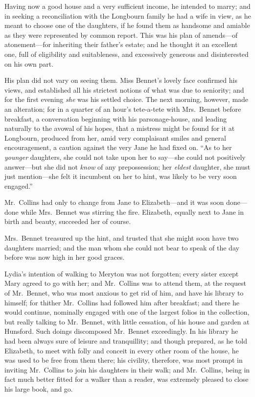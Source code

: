 \documentclass[12pt,english,oneside]{book}
\begin{document}
Having now a good house and a very sufficient income, he intended
to marry; and in seeking a reconciliation with the Longbourn family
he had a wife in view, as he meant to choose one of the daughters,
if he found them as handsome and amiable as they were represented
by common report. This was his plan of amends\mbox{---}of atonement\mbox{---}for
inheriting their father's estate; and he thought it an excellent one,
full of eligibility and suitableness, and excessively generous and
disinterested on his own part.

His plan did not vary on seeing them. Miss Bennet's lovely face confirmed
his views, and established all his strictest notions of what was due
to seniority; and for the first evening \textit{she} was his settled
choice. The next morning, however, made an alteration; for in a quarter
of an hour's tete-a-tete with Mrs.\ Bennet before breakfast, a conversation
beginning with his parsonage-house, and leading naturally to the avowal
of his hopes, that a mistress might be found for it at Longbourn,
produced from her, amid very complaisant smiles and general encouragement,
a caution against the very Jane he had fixed on. {}``As to her \textit{younger}
daughters, she could not take upon her to say\mbox{---}she could
not positively answer\mbox{---}but she did not \textit{know} of any
prepossession; her \textit{eldest} daughter, she must just mention\mbox{---}she
felt it incumbent on her to hint, was likely to be very soon engaged.''

Mr.\ Collins had only to change from Jane to Elizabeth\mbox{---}and
it was soon done\mbox{---}done while Mrs.\ Bennet was stirring the
fire. Elizabeth, equally next to Jane in birth and beauty, succeeded
her of course.

Mrs.\ Bennet treasured up the hint, and trusted that she might soon
have two daughters married; and the man whom she could not bear to
speak of the day before was now high in her good graces.

Lydia's intention of walking to Meryton was not forgotten; every sister
except Mary agreed to go with her; and Mr.\ Collins was to attend
them, at the request of Mr.\ Bennet, who was most anxious to get
rid of him, and have his library to himself; for thither Mr.\ Collins
had followed him after breakfast; and there he would continue, nominally
engaged with one of the largest folios in the collection, but really
talking to Mr.\ Bennet, with little cessation, of his house and garden
at Hunsford. Such doings discomposed Mr.\ Bennet exceedingly. In
his library he had been always sure of leisure and tranquillity; and
though prepared, as he told Elizabeth, to meet with folly and conceit
in every other room of the house, he was used to be free from them
there; his civility, therefore, was most prompt in inviting Mr.\ Collins
to join his daughters in their walk; and Mr.\ Collins, being in fact
much better fitted for a walker than a reader, was extremely pleased
to close his large book, and go.
\end{document}
